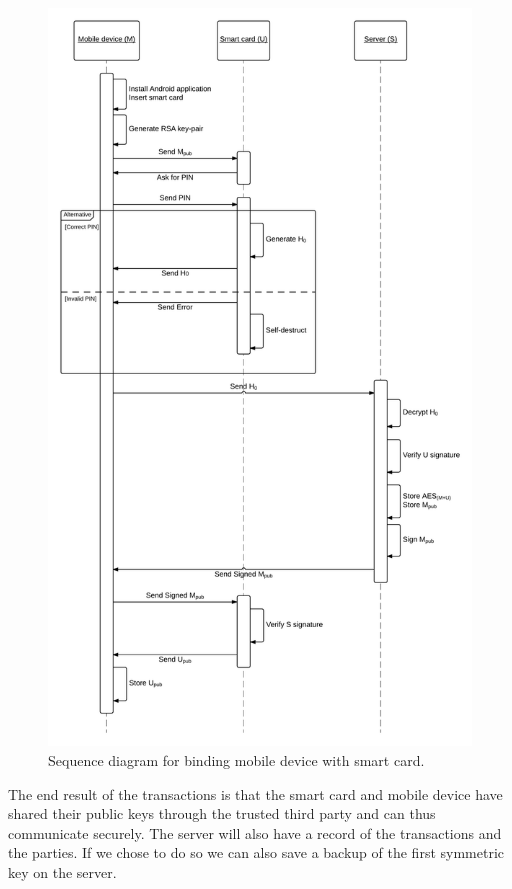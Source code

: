 \clearpage
\begin{figure}[h!]
  \captionsetup{justification=centering,margin=1.5cm}
  \caption{Sequence diagram for binding mobile device with smart card.}
  \label{fig:sqd}
  \centering
    \includegraphics[height=0.93\textheight]{images/SQD_handshake.png}
\end{figure}
\clearpage
The end result of the transactions is that the smart card and mobile device have shared their public keys through the trusted third party and can thus communicate securely. The server will also have a record of the transactions and the parties. If we chose to do so we can also save a backup of the first symmetric key on the server.

